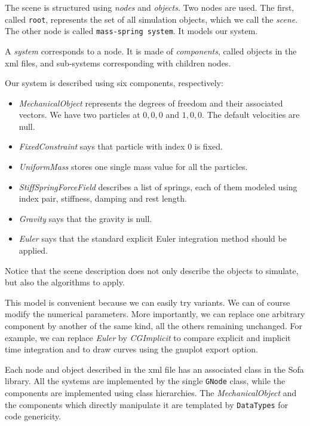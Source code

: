\documentclass[a4paper,11pt]{article}
\newcommand{\cpp}[1]{\texttt{#1}}
\begin{document}
The scene is structured using \emph{nodes} and \emph{objects}. Two nodes are used. 
The first, called \texttt{root}, represents the set of all simulation objects, which we call the \emph{scene}. 
The other node is called \texttt{mass-spring system}. 
It models our system.

A \emph{system} corresponds to a node. It is made of \emph{components}, called objects in the xml files, and sub-systems corresponding with children nodes.

Our system is described using six components, respectively:
\begin{itemize}
\item \emph{MechanicalObject} represents the degrees of freedom and their associated vectors. We have two particles at $0,0,0$ and $1,0,0$. The default velocities are null.
\item \emph{FixedConstraint} says that particle with index $0$ is fixed.
\item \emph{UniformMass} stores one single mass value for all the particles.
\item \emph{StiffSpringForceField} describes a list of springs, each of them modeled using index pair, stiffness, damping and rest length.
\item \emph{Gravity} says that the gravity is null.
\item \emph{Euler} says that the standard explicit Euler integration method should be applied. 
\end{itemize}
Notice that the scene description does not only describe the objects to simulate, but also the algorithms to apply.

This model is convenient because we can easily try variants.
We can of course modify the numerical parameters.
More importantly, we can replace one arbitrary component by another of the same kind, all the others remaining unchanged.
For example, we can replace \emph{Euler} by \emph{CGImplicit} to compare explicit and implicit time integration and to draw curves using the gnuplot export option.


Each node and object described in the xml file has an associated class in the Sofa library.
All the systems are implemented by the single \cpp{GNode} class, while the components are implemented using class hierarchies. 
The \emph{MechanicalObject} and the components which directly manipulate it are templated by \cpp{DataTypes} for code genericity.
\end{document}
